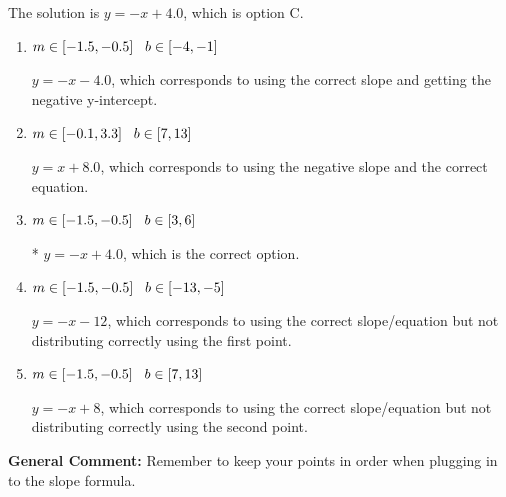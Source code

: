 \documentclass{extbook}[14pt]
\begin{document}
\begin{enumerate}
{The solution is \( y = -x + 4.0 \), which is option C.\begin{enumerate}[label=\Alph*.]
\item \( m \in [-1.5, -0.5] \hspace*{3mm} b \in [-4, -1] \)

 $y = -x -4.0$, which corresponds to using the correct slope and getting the negative y-intercept.
\item \( m \in [-0.1, 3.3] \hspace*{3mm} b \in [7, 13] \)

 $y = x + 8.0$, which corresponds to using the negative slope and the correct equation.
\item \( m \in [-1.5, -0.5] \hspace*{3mm} b \in [3, 6] \)

* $y = -x + 4.0$, which is the correct option.
\item \( m \in [-1.5, -0.5] \hspace*{3mm} b \in [-13, -5] \)

 $y = -x -12$, which corresponds to using the correct slope/equation but not distributing correctly using the first point.
\item \( m \in [-1.5, -0.5] \hspace*{3mm} b \in [7, 13] \)

 $y = -x + 8$, which corresponds to using the correct slope/equation but not distributing correctly using the second point.
\end{enumerate}

\textbf{General Comment:} Remember to keep your points in order when plugging in to the slope formula.
}
\end{enumerate}
\end{document}

